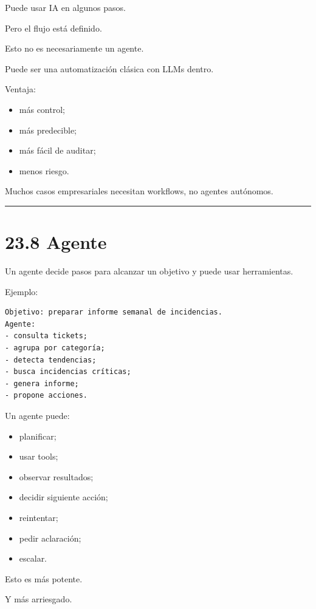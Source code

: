 Puede usar IA en algunos pasos.

Pero el flujo está definido.

Esto no es necesariamente un agente.

Puede ser una automatización clásica con LLMs dentro.

Ventaja:

\begin{itemize}
\tightlist
\item
  más control;
\item
  más predecible;
\item
  más fácil de auditar;
\item
  menos riesgo.
\end{itemize}

Muchos casos empresariales necesitan workflows, no agentes autónomos.

\begin{center}\rule{0.5\linewidth}{0.5pt}\end{center}

\section{23.8 Agente}\label{agente-1}

Un agente decide pasos para alcanzar un objetivo y puede usar
herramientas.

Ejemplo:

\begin{lstlisting}
Objetivo: preparar informe semanal de incidencias.
Agente:
- consulta tickets;
- agrupa por categoría;
- detecta tendencias;
- busca incidencias críticas;
- genera informe;
- propone acciones.
\end{lstlisting}

Un agente puede:

\begin{itemize}
\tightlist
\item
  planificar;
\item
  usar tools;
\item
  observar resultados;
\item
  decidir siguiente acción;
\item
  reintentar;
\item
  pedir aclaración;
\item
  escalar.
\end{itemize}

Esto es más potente.

Y más arriesgado.

